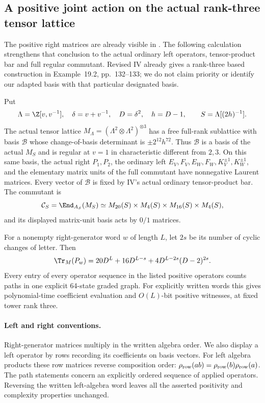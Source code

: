 \subsection{A positive joint action on the actual rank-three tensor lattice}
The positive right matrices are already visible in . The
following calculation strengthens that conclusion to the actual
ordinary left operators, tensor-product bar and full regular
commutant. Revised IV already gives a rank-three based construction
in Example~19.2, pp.~132--133; we do not claim priority or identify
our adapted basis with that particular designated basis.

\begin{finding}\label{f:positivejoint}
Put
\[
 \Lambda=\Z[v,v^{-1}],\quad \delta=v+v^{-1},\quad
 D=\delta^2,\quad h=D-1,
 \qquad S=\Lambda[(2h)^{-1}].
\]
The actual tensor lattice $M_\Lambda=(\Lambda^2\otimes\Lambda^2)^{\otimes3}$
has a free full-rank sublattice with basis $\mathcal B$ whose
change-of-basis determinant is $\pm2^{12}h^{72}$.
Thus $\mathcal B$ is a basis of the actual $M_S$ and is regular
at $v=1$ in characteristic different from $2,3$.
On this same basis, the actual right $P_1,P_2$, the ordinary left
$E_V,F_V,E_W,F_W,K_V^{\pm1},K_W^{\pm1}$, and the elementary
matrix units of the full commutant have nonnegative Laurent matrices.
Every vector of $\mathcal B$ is fixed by IV's actual ordinary
tensor-product bar. The commutant is
\[
 \mathcal C_S=\End_{A_S}(M_S)
 \simeq M_{20}(S)\times M_4(S)\times M_{16}(S)\times M_4(S),
\]
and its displayed matrix-unit basis acts by $0/1$ matrices.

For a nonempty right-generator word $w$ of length $L$, let $2s$
be its number of cyclic changes of letter. Then
\begin{equation}\label{eq:allwordpositive}
 \Tr_M(P_w)=20D^L+16D^{L-s}
              +4D^{L-2s}(D-2)^{2s}.
\end{equation}
Every entry of every operator sequence in the listed positive
operators counts paths in one explicit 64-state graded graph.
For explicitly written words this gives polynomial-time coefficient
evaluation and $O(L)$-bit positive witnesses, at fixed tower rank three.
\end{finding}

\paragraph{Left and right conventions.}
Right-generator matrices multiply in the written algebra order.
We also display a left operator by rows recording its coefficients
on basis vectors. For left algebra products these row matrices
reverse composition order: $\rho_{\rm row}(ab)=
\rho_{\rm row}(b)\rho_{\rm row}(a)$.
The path statements concern an explicitly ordered sequence of
applied operators. Reversing the written left-algebra word leaves
all the asserted positivity and complexity properties unchanged.

